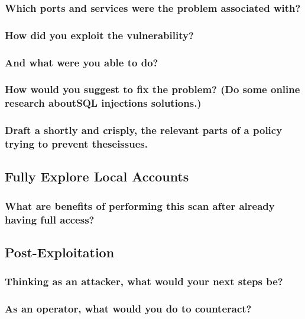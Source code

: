 \subsubsection{Which ports and services were the problem associated with?}
\subsubsection{How did you exploit the vulnerability?}
\subsubsection{And what were you able to do?}
\subsubsection{How would you suggest to fix the problem? (Do some online research aboutSQL injections solutions.)}
\subsubsection{Draft a shortly and crisply, the relevant parts of a policy trying to prevent theseissues.}

\subsection{Fully Explore Local Accounts}
\subsubsection{What are benefits of performing this scan after already having full access?}

\subsection{Post-Exploitation}
\subsubsection{Thinking as an attacker, what would your next steps be?}
\subsubsection{As an operator, what would you do to counteract?}